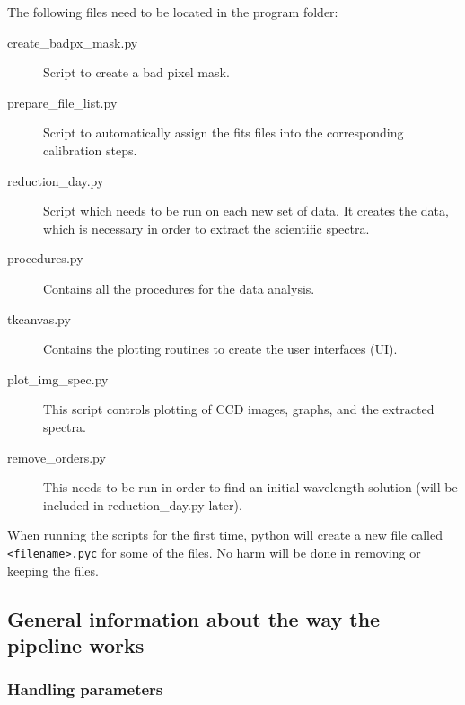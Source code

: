 \documentclass[10pt,a4paper]{article}
\begin{document}
\noindent The following files need to be located in the program folder:
\begin{description}
\item[create\_badpx\_mask.py] Script to create a bad pixel mask.
\item[prepare\_file\_list.py] Script to automatically assign the fits files into the corresponding calibration steps.
\item[reduction\_day.py] Script which needs to be run on each new set of data. It creates the data, which is necessary in order to extract the scientific spectra.
\item[procedures.py] Contains all the procedures for the data analysis.
\item[tkcanvas.py] Contains the plotting routines to create the user interfaces (UI).
\item[plot\_img\_spec.py] This script controls plotting of CCD images, graphs, and the extracted spectra.
\item[remove\_orders.py] This needs to be run in order to find an initial wavelength solution (will be included in reduction\_day.py later).
\end{description}

When running the scripts for the first time, python will create a new file called \verb|<filename>.pyc| for some of the files. No harm will be done in removing or keeping the files.


\subsection{General information about the way the pipeline works}

\subsubsection*{Handling parameters}
\end{document}
